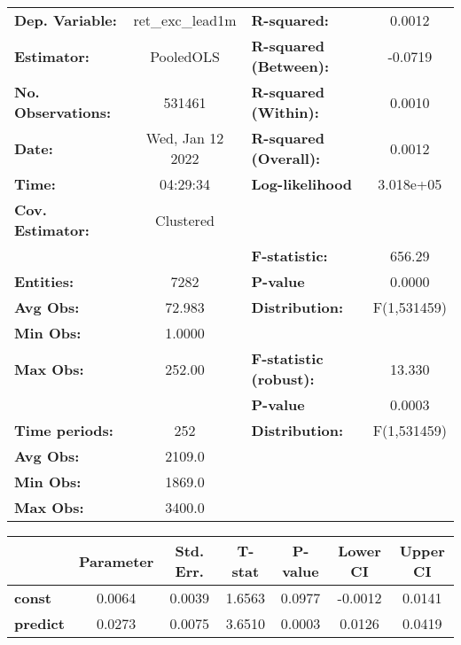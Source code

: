 \begin{center}
\begin{tabular}{lclc}
\toprule
\textbf{Dep. Variable:}    &  ret\_exc\_lead1m  & \textbf{  R-squared:         }   &      0.0012      \\
\textbf{Estimator:}        &     PooledOLS      & \textbf{  R-squared (Between):}  &     -0.0719      \\
\textbf{No. Observations:} &       531461       & \textbf{  R-squared (Within):}   &      0.0010      \\
\textbf{Date:}             &  Wed, Jan 12 2022  & \textbf{  R-squared (Overall):}  &      0.0012      \\
\textbf{Time:}             &      04:29:34      & \textbf{  Log-likelihood     }   &    3.018e+05     \\
\textbf{Cov. Estimator:}   &     Clustered      & \textbf{                     }   &                  \\
\textbf{}                  &                    & \textbf{  F-statistic:       }   &      656.29      \\
\textbf{Entities:}         &        7282        & \textbf{  P-value            }   &      0.0000      \\
\textbf{Avg Obs:}          &       72.983       & \textbf{  Distribution:      }   &   F(1,531459)    \\
\textbf{Min Obs:}          &       1.0000       & \textbf{                     }   &                  \\
\textbf{Max Obs:}          &       252.00       & \textbf{  F-statistic (robust):} &      13.330      \\
\textbf{}                  &                    & \textbf{  P-value            }   &      0.0003      \\
\textbf{Time periods:}     &        252         & \textbf{  Distribution:      }   &   F(1,531459)    \\
\textbf{Avg Obs:}          &       2109.0       & \textbf{                     }   &                  \\
\textbf{Min Obs:}          &       1869.0       & \textbf{                     }   &                  \\
\textbf{Max Obs:}          &       3400.0       & \textbf{                     }   &                  \\
\bottomrule
\end{tabular}
\begin{tabular}{lcccccc}
                 & \textbf{Parameter} & \textbf{Std. Err.} & \textbf{T-stat} & \textbf{P-value} & \textbf{Lower CI} & \textbf{Upper CI}  \\
\midrule
\textbf{const}   &       0.0064       &       0.0039       &      1.6563     &      0.0977      &      -0.0012      &       0.0141       \\
\textbf{predict} &       0.0273       &       0.0075       &      3.6510     &      0.0003      &       0.0126      &       0.0419       \\
\bottomrule
\end{tabular}
\end{center}
